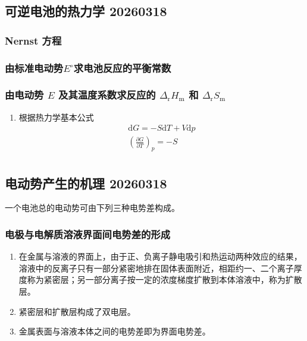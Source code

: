 \subsection{可逆电池的热力学 20260318}

\subsubsection{Nernst 方程}

\subsubsection[由标准电动势 E 求电池反应的平衡常数]{由标准电动势$E^{\circ}$求电池反应的平衡常数}

\subsubsection[由电动势 E 及其温度系数求反应的 Δ_r H_m 和 Δ_r S_m]
{由电动势 $E$ 及其温度系数求反应的 $\Delta_{\mathrm{r}}H_{\mathrm{m}}$ 和 $\Delta_{\mathrm{r}}S_{\mathrm{m}}$}

\begin{enumerate}
    \item 根据热力学基本公式
    \begin{equation*}
        \begin{aligned}
            \mathrm{d}G = -S \mathrm{d}T + V \mathrm{d}p \\
            \left(\frac{\partial G}{\partial T}\right)_{p} = -S \\
        \end{aligned}
    \end{equation*}
\end{enumerate}

\subsection{电动势产生的机理 20260318}

一个电池总的电动势可由下列三种电势差构成。

\subsubsection{电极与电解质溶液界面间电势差的形成}

\begin{enumerate}
    \item 在金属与溶液的界面上，由于正、负离子静电吸引和热运动两种效应的结果，溶液中的反离子只有一部分紧密地排在固体表面附近，相距约一、二个离子厚度称为紧密层；另一部分离子按一定的浓度梯度扩散到本体溶液中，称为扩散层。
    \item 紧密层和扩散层构成了双电层。
    \item 金属表面与溶液本体之间的电势差即为界面电势差。
\end{enumerate}

